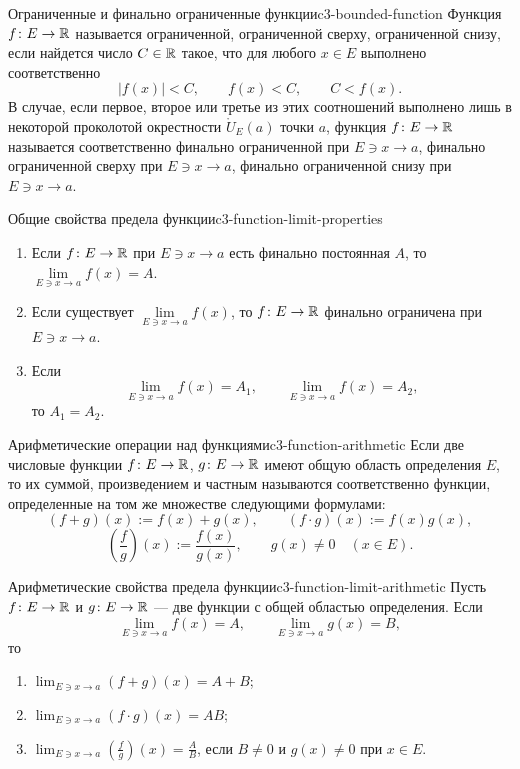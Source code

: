 \begin{definition}{Ограниченные и финально ограниченные функции}{c3-bounded-function}
  Функция $f\colon E\to\mathbb{R}$ называется ограниченной, ограниченной сверху,
  ограниченной снизу, если найдется число $C\in\mathbb{R}$ такое, что для любого
  $x\in E$ выполнено соответственно
  \[
    |f(x)|<C,\qquad f(x)<C,\qquad C<f(x).
  \]
  В случае, если первое, второе или третье из этих соотношений выполнено
  лишь в некоторой проколотой окрестности $\mathring U_E(a)$ точки $a$,
  функция $f\colon E\to\mathbb{R}$ называется соответственно финально ограниченной
  при $E\ni x\to a$, финально ограниченной сверху при $E\ni x\to a$,
  финально ограниченной снизу при $E\ni x\to a$.
\end{definition}

\begin{theorem}{Общие свойства предела функции}{c3-function-limit-properties}
  \begin{enumerate}[label=\alph*)]
    \item Если $f\colon E\to\mathbb{R}$ при $E\ni x\to a$ есть финально постоянная
      $A$, то $\lim\limits_{E\ni x\to a}f(x)=A$.
    \item Если существует $\lim\limits_{E\ni x\to a}f(x)$, то
      $f\colon E\to\mathbb{R}$ финально ограничена при $E\ni x\to a$.
    \item Если
      \[
        \lim_{E\ni x\to a}f(x)=A_1,
        \qquad
        \lim_{E\ni x\to a}f(x)=A_2,
      \]
      то $A_1=A_2$.
  \end{enumerate}
\end{theorem}

\begin{definition}{Арифметические операции над функциями}{c3-function-arithmetic}
  Если две числовые функции $f\colon E\to\mathbb{R}$, $g\colon E\to\mathbb{R}$ имеют
  общую область определения $E$, то их суммой, произведением и частным
  называются соответственно функции, определенные на том же множестве
  следующими формулами:
  \[
    (f+g)(x):=f(x)+g(x),
    \qquad
    (f\cdot g)(x):=f(x)g(x),
  \]
  \[
    \left(\frac fg\right)(x):=\frac{f(x)}{g(x)},
    \qquad g(x)\ne0\quad(x\in E).
  \]
\end{definition}

\begin{theorem}{Арифметические свойства предела функции}{c3-function-limit-arithmetic}
  Пусть $f\colon E\to\mathbb{R}$ и $g\colon E\to\mathbb{R}$ — две функции с общей
  областью определения. Если
  \[
    \lim_{E\ni x\to a}f(x)=A,
    \qquad
    \lim_{E\ni x\to a}g(x)=B,
  \]
  то
  \begin{enumerate}[label=\alph*)]
    \item $\displaystyle\lim_{E\ni x\to a}(f+g)(x)=A+B$;
    \item $\displaystyle\lim_{E\ni x\to a}(f\cdot g)(x)=AB$;
    \item $\displaystyle\lim_{E\ni x\to a}\left(\frac fg\right)(x)=\frac AB$,
      если $B\ne0$ и $g(x)\ne0$ при $x\in E$.
  \end{enumerate}
\end{theorem}

